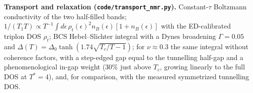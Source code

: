 \documentclass[11pt]{article}
\newcommand{\nut}{\nu\approx0.3}
\begin{document}
\textbf{Transport and relaxation (\texttt{code/transport\_nmr.py}).} Constant-$\tau$ Boltzmann conductivity of the two half-filled bands; $1/(T_1T)\propto T^{-1}\int d\epsilon\,\rho_t(\epsilon)^2 n_B(\epsilon)[1+n_B(\epsilon)]$ with the ED-calibrated triplon DOS $\rho_t$; BCS Hebel--Slichter integral with a Dynes broadening $\Gamma=0.05$ and $\Delta(T)=\Delta_0\tanh(1.74\sqrt{T_c/T-1})$; for $\nut$ the same integral without coherence factors, with a step-edged gap equal to the tunnelling half-gap and a phenomenological in-gap weight ($30\%$ just above $T_c$, growing linearly to the full DOS at $T^*=4$), and, for comparison, with the measured symmetrized tunnelling DOS.
\end{document}
